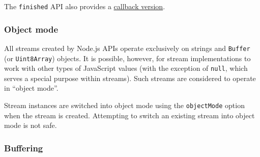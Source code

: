 \begin{Shaded}
\begin{Highlighting}[]
 \OperatorTok{;}
 \OperatorTok{;}

\OperatorTok{=} \NormalTok{(}\NormalTok{)}\OperatorTok{;}

  \NormalTok{() \{}
   \OperatorTok{;}
  \NormalTok{(}\NormalTok{)}\OperatorTok{;}
\NormalTok{\}}

\NormalTok{()}\NormalTok{(}\NormalTok{)}\OperatorTok{;}
\NormalTok{()}\OperatorTok{;} 
\end{Highlighting}
\end{Shaded}

The \texttt{finished} API also provides a
\hyperref[streamfinishedstream-options-callback]{callback version}.

\subsubsection{Object mode}\label{object-mode}

All streams created by Node.js APIs operate exclusively on strings and
\texttt{Buffer} (or \texttt{Uint8Array}) objects. It is possible,
however, for stream implementations to work with other types of
JavaScript values (with the exception of \texttt{null}, which serves a
special purpose within streams). Such streams are considered to operate
in ``object mode''.

Stream instances are switched into object mode using the
\texttt{objectMode} option when the stream is created. Attempting to
switch an existing stream into object mode is not safe.

\subsubsection{Buffering}\label{buffering}

